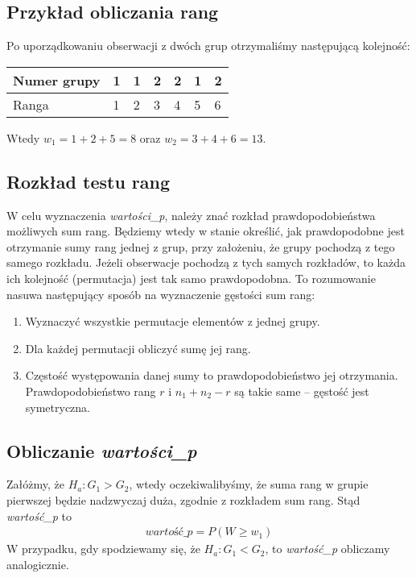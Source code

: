 \documentclass[a4paper]{article}
\begin{document}
\subsection{Przykład obliczania rang}
Po uporządkowaniu obserwacji z dwóch grup otrzymaliśmy następującą kolejność:
\begin{center}
   \begin{tabular}{ | l | l | l | l | l | l | l | }
    \hline
    Numer grupy & 1 & 1 & 2 & 2 & 1 & 2 \\ \hline
    Ranga        & 1 & 2 & 3 & 4 & 5 & 6 \\ \hline
    \end{tabular}
\end{center}

Wtedy $w_1 = 1 + 2 + 5 = 8$ oraz $w_2 = 3 + 4 + 6 = 13$.

\subsection{Rozkład testu rang}
W celu wyznaczenia \textit{wartości\_p}, należy znać rozkład prawdopodobieństwa możliwych sum rang. Będziemy wtedy w stanie określić, jak prawdopodobne jest otrzymanie sumy rang jednej z grup, przy założeniu, że grupy pochodzą z tego samego rozkładu. Jeżeli obserwacje pochodzą z tych samych rozkładów, to każda ich kolejność (permutacja) jest tak samo prawdopodobna. To rozumowanie nasuwa następujący sposób na wyznaczenie gęstości sum rang:
\begin{enumerate}
    \item Wyznaczyć wszystkie permutacje elementów z jednej grupy.
    \item Dla każdej permutacji obliczyć sumę jej rang. 
    \item Częstość występowania danej sumy to prawdopodobieństwo jej otrzymania. Prawdopodobieństwo rang $r$ i $n_1 + n_2 - r$ są takie same -- gęstość jest symetryczna.

\end{enumerate}

\subsection{Obliczanie \textit{wartości\_p}}
Załóżmy, że $H_a : G_1 > G_2$, wtedy oczekiwalibyśmy, że suma rang w grupie pierwszej będzie nadzwyczaj duża, zgodnie z rozkładem sum rang. Stąd \textit{wartość\_p} to 
\begin{align}
     \textit{wartość\_p} = P(W \geq w_1)
\end{align}
W przypadku, gdy spodziewamy się, że $H_a : G_1 < G_2$, to \textit{wartość\_p} obliczamy analogicznie.
\end{document}

